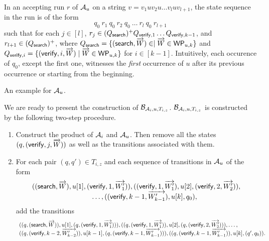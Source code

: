 In an accepting run $r$ of $\mathcal{A}_u$ on a string $v = v_1 u v_2 u \dots v_l u v_{l+1}$, the state sequence in the run is of the form 
$$q_0\ r_1\ q_0\ r_2\ q_0\ \dots\ r_l\ q_0\ r_{l+1}$$ 
such that  for each $j \in [l]$, $r_j \in (Q_{\mathsf{search}})^+ Q_{\mathsf{verify}, 1}  \dots  Q_{\mathsf{verify}, k-1}$, and $r_{l+1} \in (Q_{\mathsf{search}})^+$, where $Q_{\mathsf{search}}  = \{(\mathsf{search}, \overrightarrow{W}) \in \mid \overrightarrow{W} \in \mathsf{WP}_{u,k}\}$ and $Q_{\mathsf{verify}, i} = \{(\mathsf{verify}, i, \overrightarrow{W}) \mid \overrightarrow{W} \in \mathsf{WP}_{u,k}\}$ for $i \in [k-1]$. Intuitively, each occurence of $q_0$, except the first one, witnesses the \emph{first} occurrence of $u$ after its previous occurrence or starting from the beginning.


\begin{example}
	An example for $\mathcal{A}_u$.
\end{example}

We are ready to present the construction of $\mathcal{B}_{\mathcal{A}_i, u,  T_{i, z}}$. $\mathcal{B}_{\mathcal{A}_i, u,  T_{i, z}}$ is constructed by the following two-step procedure.
\begin{enumerate}
\item Construct the product of $\mathcal{A}_i$ and $\mathcal{A}_u$. Then remove all the states $(q, (\mathsf{verify}, j, \overrightarrow{W}))$ as well as the transitions associated with them.

\item For each pair $(q,q') \in T_{i,z}$ and each sequence of transitions in $\mathcal{A}_u$ of the form  
$$
\begin{array}{l}
((\search, \overrightarrow{W}), u[1], (\verify, 1, \overrightarrow{W'_1})), ((\verify, 1, \overrightarrow{W'_1}), u[2], 
 (\verify, 2, \overrightarrow{W'_2})), \\
 \hspace{3cm} \dots, ((\verify, k-1, \overrightarrow{W'_{k-1}}), u[k], q_0),
\end{array}
$$ 
add the transitions 
$$
\begin{array}{l}
((q, (\mathsf{search}, \overrightarrow{W})), u[1], (q, (\mathsf{verify}, 1, \overrightarrow{W'_1}))), ((q, (\mathsf{verify}, 1, \overrightarrow{W'_1})), u[2], (q, (\mathsf{verify}, 2, \overrightarrow{W'_2}))), \dots,  \\
((q, (\mathsf{verify}, k-2, \overrightarrow{W'_{k-2}})), u[k-1], (q, (\mathsf{verify}, k-1, \overrightarrow{W'_{k-1}}))), ((q, (\mathsf{verify}, k-1, \overrightarrow{W'_{k-1}})), u[k], (q', q_0)).
\end{array}
$$
\end{enumerate}

